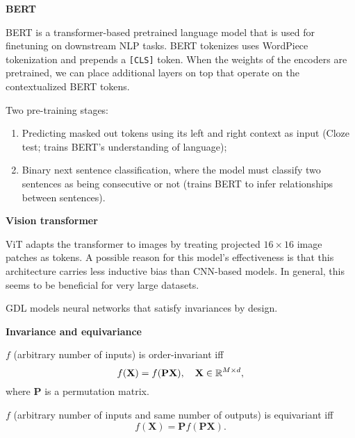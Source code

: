 \documentclass[10pt]{article}
\newenvironment{topic}[1]
{\textbf{\sffamily \footnotesize \colorbox{black}{\rlap{\textbf{\textcolor{white}{#1}}}\hspace{\linewidth}\hspace{-2\fboxsep}}}}
{}
\newenvironment{subtopic}[1]
{\vspace{0.1cm} \begin{center}\textbf{\footnotesize \sffamily #1}\end{center}}
{}
\renewcommand{\mat}[1]{\ensuremath{\mathbf{#1}}}
\begin{document}
\begin{multicols*}{3}
\begin{topic}{Transformers}
        \begin{subtopic}{BERT}
            BERT is a transformer-based pretrained language model that is used for finetuning on
            downstream NLP tasks. BERT tokenizes uses WordPiece tokenization and prepends a
            \texttt{[CLS]} token. When the weights of the encoders are pretrained, we can place
            additional layers on top that operate on the contextualized BERT tokens.

            Two pre-training stages:
            \begin{enumerate}[left=0pt]
                \item Predicting masked out tokens using its left and right context as input (Cloze test; trains BERT's
                      understanding of language);
                \item Binary next sentence classification, where the model must classify two sentences as being
                      consecutive or not (trains BERT to infer relationships between sentences).
            \end{enumerate}
        \end{subtopic}

        \begin{subtopic}{Vision transformer}
            ViT adapts the transformer to images by treating projected $16 \times 16$ image patches
            as tokens. A possible reason for this model's effectiveness is that this architecture
            carries less inductive bias than CNN-based models. In general, this seems to be beneficial
            for very large datasets.
        \end{subtopic}

    \end{topic}

    \begin{topic}{Geometric deep learning}
        GDL models neural networks that satisfy invariances by design.

        \begin{subtopic}{Invariance and equivariance}
            $f$ (arbitrary number of inputs) is order-invariant iff \[
                f(\mat{X}) = f(\mat{P}\mat{X}), \quad \mat{X} \in \R^{M \times d},
            \]
            where $\mat{P}$ is a permutation matrix.

            $f$ (arbitrary number of inputs and same number of outputs) is equivariant iff \[
                f(\mat{X}) = \mat{P} f(\mat{P} \mat{X}).
            \]


\end{subtopic}
\end{topic}
\end{multicols*}
\end{document}
